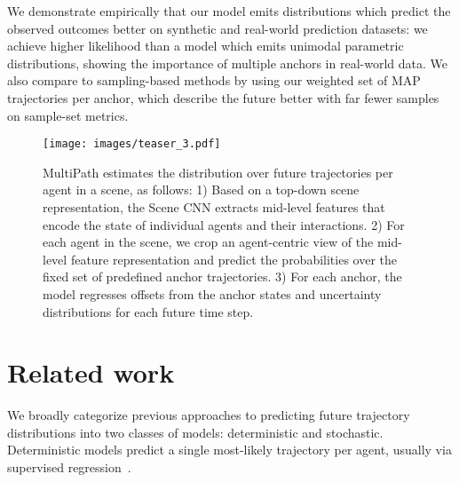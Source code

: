 \documentclass{article}
\newcommand{\out}[1]{}
\newcommand{\multiflow}{MultiPath\xspace}
\begin{document}
We demonstrate empirically that our model emits distributions which predict the observed outcomes better on synthetic and real-world prediction datasets: we achieve higher likelihood than a model which emits unimodal parametric distributions, showing the importance of multiple anchors in real-world data. We also compare to sampling-based methods by using our weighted set of MAP trajectories per anchor, which describe the future better with far fewer samples on sample-set metrics.
\out{

Notably, a large amount of previous work has modeled a {\em deterministic} future, providing only a single best guess at where agents might be~\cite{Luo18, Casas18, Sadeghian18, Pellegrini09, Bansal19}, which is of limited practical use.

One way to capture the inherent stochasticity of the future is via a set of trajectory samples, which should cover the space of possible outcomes well with as few samples as possible.  A common way to obtain such samples is from rolling out 1-time-step stochastic policies~\cite{Rhinehart18, Ma17, Kitani12}, or stochastic latent-space random sampling models such as Conditional Variational Auto-Encoders (CVAEs)~\cite{Lee17, Hong19, Bhattacharyya18BestOfMany, Ivanovic18}.
}
\begin{figure}[tb]
  \centering
\texttt{[image: images/teaser\_3.pdf]}
\caption{\small
 \multiflow estimates the distribution over future trajectories per agent in a scene, as follows: 1) Based on a top-down scene representation, the Scene CNN extracts mid-level features that encode the state of individual agents and their interactions. 2) For each agent in the scene, we crop an agent-centric view of the mid-level feature representation and predict the probabilities over the fixed set of  predefined anchor trajectories. 3) For each anchor, the model regresses offsets from the anchor states and uncertainty distributions for each future time step.
 \vspace{-0.8cm}}
\label{fig:teaser}
\end{figure} \section{Related work} \label{sec:relwork}
We broadly categorize previous approaches to predicting future trajectory distributions into two classes of models: deterministic and stochastic. 
Deterministic models predict a single most-likely trajectory per agent, usually via supervised regression~\cite{Luo18, Casas18, Sadeghian18, Pellegrini09, Bansal19, Helbing95}.
\end{document}
